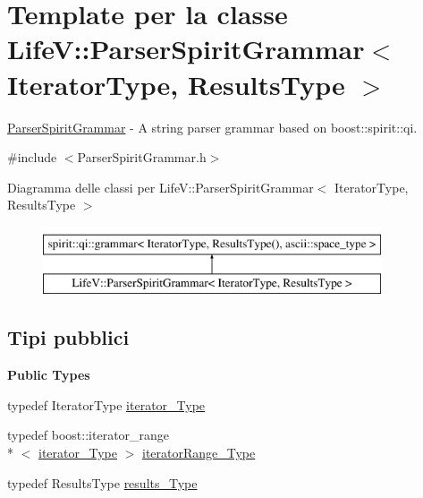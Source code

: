 \hypertarget{classLifeV_1_1ParserSpiritGrammar}{\section{Template per la classe Life\-V\-:\-:Parser\-Spirit\-Grammar$<$ Iterator\-Type, Results\-Type $>$}
\label{classLifeV_1_1ParserSpiritGrammar}
}


\hyperlink{classLifeV_1_1ParserSpiritGrammar}{Parser\-Spirit\-Grammar} -\/ A string parser grammar based on {\ttfamily boost\-::spirit\-::qi}.  




{\ttfamily \#include $<$Parser\-Spirit\-Grammar.\-h$>$}

Diagramma delle classi per Life\-V\-:\-:Parser\-Spirit\-Grammar$<$ Iterator\-Type, Results\-Type $>$\begin{figure}[H]
\begin{center}
\leavevmode
\includegraphics[height=2.000000cm]{classLifeV_1_1ParserSpiritGrammar}
\end{center}
\end{figure}
\subsection*{Tipi pubblici}
\begin{Indent}{\bf Public Types}\par
\begin{DoxyCompactItemize}
\item 
typedef Iterator\-Type \hyperlink{classLifeV_1_1ParserSpiritGrammar_aaa28e2ed8f68d686da1e0bcc5834ed3b}{iterator\-\_\-\-Type}
\item 
typedef boost\-::iterator\-\_\-range\\*
$<$ \hyperlink{classLifeV_1_1ParserSpiritGrammar_aaa28e2ed8f68d686da1e0bcc5834ed3b}{iterator\-\_\-\-Type} $>$ \hyperlink{classLifeV_1_1ParserSpiritGrammar_a8aca47ceac2876986dbc2ff9ee4d2edd}{iterator\-Range\-\_\-\-Type}
\item 
typedef Results\-Type \hyperlink{classLifeV_1_1ParserSpiritGrammar_a98dabec1a4a9a743a1d3b35e994cec7c}{results\-\_\-\-Type}
\end{DoxyCompactItemize}
\end{Indent}
